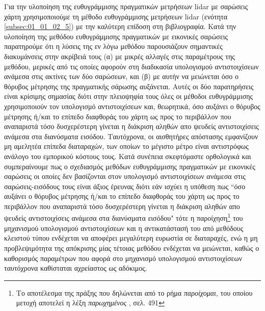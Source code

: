 Για την υλοποίηση της ευθυγράμμισης πραγματικών μετρήσεων lidar με σαρώσεις
χάρτη χρησιμοποιούμε τη μέθοδο ευθυγράμμισης μετρήσεων lidar (ενότητα
\ref{subsec:01_01_02_5}) με την καλύτερη επίδοση στη βιβλιογραφία. Κατά την
υλοποίηση της μεθόδου ευθυγράμμισης πραγματικών με εικονικές σαρώσεις
παρατηρούμε ότι η λύσεις της εν λόγω μεθόδου παρουσιάζουν σημαντικές
διακυμάνσεις στην ακρίβειά τους (α) με μικρές αλλαγές στις παραμέτρους της
μεθόδου, μερικές από τις οποίες αφορούν στη διαδικασία υπολογισμού
αντιστοιχίσεων ανάμεσα στις ακτίνες των δύο σαρώσεων, και (β) με αυτήν να
μειώνεται όσο ο θόρυβος μέτρησης της πραγματικής σάρωσης αυξάνεται. Αυτές οι
δύο παρατηρήσεις είναι κρίσιμης σημασίας διότι στην πλειοψηφία τους όλες οι
μέθοδοι ευθυγράμμισης χρησιμοποιούν τον υπολογισμό αντιστοιχίσεων και,
θεωρητικά, όσο αυξάνει ο θόρυβος μέτρησης ή/και το επίπεδο διαφθοράς του χάρτη
ως προς το περιβάλλον που αναπαριστά τόσο δυσχερέστερη γίνεται η διάκριση
αληθών απο ψευδείς αντιστοιχίσεις ανάμεσα στα διανύσματα εισόδου. Ταυτόχρονα,
οι αισθητήρες απόστασης εμφανίζουν μη αμελητέα επίπεδα διαταραχών, των οποίων
το μέγιστο μέτρο είναι αντιστρόφως ανάλογο του εμπορικού κόστους τους. Κατά
συνέπεια σκεφτόμαστε ορθολογικά και συμπεραίνουμε πως ο σχεδιασμός μεθόδων
ευθυγράμμισης πραγματικών με εικονικές σαρώσεις οι οποίες δεν βασίζονται στον
υπολογισμό αντιστοιχίσεων ανάμεσα στις σαρώσεις-εισόδους τους είναι άξιος
έρευνας διότι εάν ισχύει η υπόθεση πως ``όσο αυξάνει ο θόρυβος μέτρησης ή/και
το επίπεδο διαφθοράς του χάρτη ως προς το περιβάλλον που αναπαριστά τόσο
δυσχερέστερη γίνεται η διάκριση αληθών απο ψευδείς αντιστοιχίσεις ανάμεσα στα
διανύσματα εισόδου" τότε η παροίχηση\footnote{Το αποτέλεσμα της πράξης που
δηλώνεται από το ρήμα \textit{παροίχομαι}, του οποίου μετοχή αποτελεί η λέξη
\textit{παρωχημένος} \cite{liddell_scott}, σελ. 491} του μηχανισμού υπολογισμού
αντιστοιχίσεων και η αντικατάστασή του από μεθόδους κλειστού τύπου ενδέχεται να
αποφέρει μεγαλύτερη ευρωστία σε διαταραχές, ενώ η μη προβλεψιμότητα της
απόκρισης μίας τέτοιας μεθόδου ενδέχεται να μειώνεται, καθώς ο καθορισμός
παραμέτρων που αφορά στο μηχανισμό υπολογισμού αντιστοιχίσεων ταυτόχρονα
καθίσταται αχρείαστος ως αδόκιμος.\\


